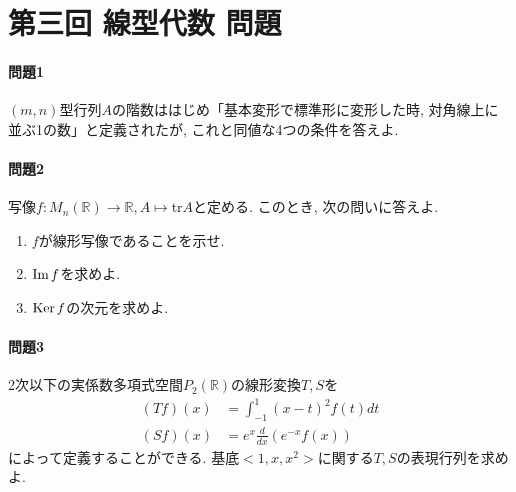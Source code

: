 \documentclass[a4j,dvipdfmx]{jsarticle}
\newcommand{\R}{\mathbb{R}}
\newcommand{\tr}{\mathrm{tr}}
\newcommand{\Ker}{\mathrm{Ker}\hspace{0.5mm}}
\renewcommand{\Im}{\mathrm{Im}\hspace{0.5mm}}
\begin{document}
    \part*{第三回 線型代数 問題}
    \subsection*{問題1}
        $(m,n)$型行列$A$の階数ははじめ「基本変形で標準形に変形した時, 対角線上に並ぶ1の数」と定義されたが, これと同値な4つの条件を答えよ.
    \subsection*{問題2}
        写像$f:M_n(\R)\to\R, A\mapsto\tr A$と定める. このとき, 次の問いに答えよ.
        \begin{enumerate}
            \item $f$が線形写像であることを示せ.
            \item $\Im f$を求めよ.
            \item $\Ker f$の次元を求めよ. 
        \end{enumerate}
    \subsection*{問題3}
        2次以下の実係数多項式空間$P_2(\R)$の線形変換$T,S$を
        \begin{align*}
            (Tf)(x)&=\int_{-1}^{1}(x-t)^2f(t)dt\\
            (Sf)(x)&=e^{x}\frac{d}{dx}(e^{-x}f(x))
        \end{align*}
        によって定義することができる. 基底$<1,x,x^2>$に関する$T,S$の表現行列を求めよ.
\end{document}
